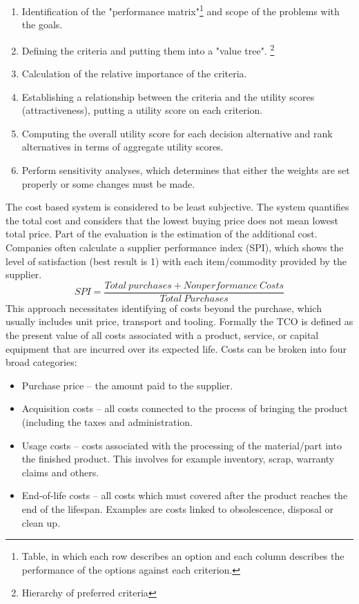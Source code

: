 \documentclass[oneside,12pt]{article}%
\begin{document}
\begin{enumerate}
  \item Identification of the "performance matrix"\footnote{Table, in which each row describes an option and each column describes the performance of the options against each criterion.} and scope of the problems with the goals.
  \item Defining the criteria and putting them into a "value tree". \footnote{Hierarchy of preferred criteria}
  \item Calculation of the relative importance of the criteria.
  \item Establishing a relationship between the criteria and the utility scores (attractiveness), putting a utility score on each criterion.
  \item Computing the overall utility score for each decision alternative and rank alternatives in terms of aggregate utility scores.
  \item Perform sensitivity analyses, which determines that either the weights are set properly or some changes must be made.
\end{enumerate}


The cost based system is considered to be least subjective. The system quantifies the total cost and considers that the lowest buying price does not mean lowest total price. Part of the evaluation is the estimation of the additional cost. Companies often calculate a supplier performance index (SPI), which shows the level of satisfaction (best result is 1) with each item/commodity provided by the supplier.
\newline
$$SPI = \frac{Total \: purchases + Nonperformance \: Costs}{Total \: Purchases}$$
\newline
This approach necessitates identifying of costs beyond the purchase, which usually includes unit price, transport and tooling. Formally the TCO is defined as the present value of all costs associated with a product, service, or capital equipment that are incurred over its expected life. Costs can be broken into four broad categories:


\begin{itemize}
\item Purchase price – the amount paid to the supplier.
\item Acquisition costs – all costs connected to the process of bringing the product (including the taxes and administration.
\item Usage costs – costs associated with the processing of the material/part into the finished product. This involves for example inventory, scrap, warranty claims and others.
\item End-of-life costs – all costs which must covered after the product reaches the end of the lifespan. Examples are costs linked to obsolescence, disposal or clean up.
\end{itemize}
\end{document}
